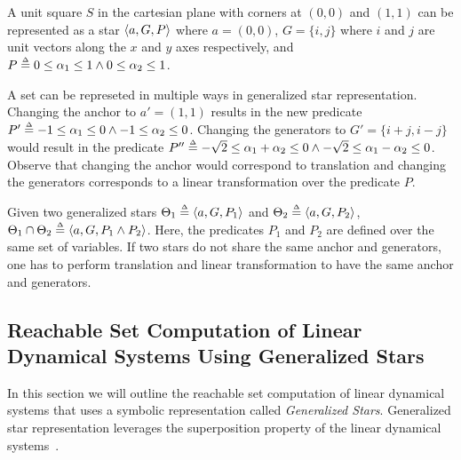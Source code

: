 \begin{example}
\label{ex:genStar}
A unit square $S$ in the cartesian plane with corners at $(0,0)$ and $(1,1)$ can be represented as a star $\tup{a, G, P}$ where $a = (0,0)$, $G = \{i, j\}$ where $i$ and $j$ are unit vectors along the $x$ and $y$ axes respectively, and $P \mathrel{\stackrel{\scriptscriptstyle\Delta}{=}} 0 \leq \alpha_1 \leq 1 \wedge 0 \leq \alpha_2 \leq 1$.

A set can be represeted in multiple ways in generalized star representation. Changing the anchor to $a' = (1,1)$ results in the new predicate $P' \mathrel{\stackrel{\scriptscriptstyle\Delta}{=}} -1 \leq \alpha_1 \leq 0 \wedge -1 \leq \alpha_2 \leq 0$. Changing the generators to $G' = \{i+j, i-j\}$ would result in the predicate $P'' \mathrel{\stackrel{\scriptscriptstyle\Delta}{=}} -\sqrt{2} \leq \alpha_1 + \alpha_2 \leq 0 \wedge -\sqrt{2} \leq \alpha_1 - \alpha_2 \leq 0$. Observe that changing the anchor would correspond to translation and changing the generators corresponds to a linear transformation over the predicate $P$.
\end{example}


Given two generalized stars $\Theta_1 \deq \tup{a, G, P_1}$ and $\Theta_2 \deq \tup{a, G, P_2}$, $\Theta_1 \cap \Theta_2 \deq \tup{a, G, P_1 \wedge P_2}$. 
%
Here, the predicates $P_1$ and $P_2$ are defined over the same set of variables. 
%
If two stars do not share the same anchor and generators, one has to perform translation and linear transformation to have the same anchor and generators. 


\subsection{Reachable Set Computation of Linear Dynamical Systems Using Generalized Stars}
\label{sec:reachStars}

In this section we will outline the reachable set computation of linear dynamical systems that uses a symbolic representation called \emph{Generalized Stars}.
%
Generalized star representation leverages the superposition property of the linear dynamical systems~\cite{duggirala2016parsimonious}.
%

